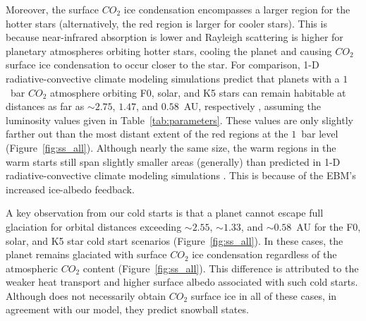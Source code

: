 \documentclass[fleqn,usenatbib]{mnras}
\begin{document}
Moreover, the surface $CO_{\mathrm{2}}$ ice condensation encompasses a larger region for the hotter stars (alternatively, the red region is larger for cooler stars). This is because near-infrared absorption is lower and Rayleigh scattering is higher for planetary atmospheres orbiting hotter stars, cooling the planet and causing $CO_{\mathrm{2}}$ surface ice condensation to occur closer to the star. For comparison, 1-D radiative-convective climate modeling simulations predict that planets with a $1$~bar $CO_{\mathrm{2}}$ atmosphere orbiting F0, solar, and K5 stars can remain habitable at distances as far as $\sim 2.75$, $1.47$, and $0.58$~AU, respectively \citep{kasting1993, KumarKopparapu2013,Ramirez2018}, assuming the luminosity values given in Table~\ref{tab:parameters}. These values are only slightly farther out than the most distant extent of the red regions at the $1$~bar level (Figure~\ref{fig:ss_all}). Although nearly the same size, the warm regions in the warm starts still span slightly smaller areas (generally) than predicted in 1-D radiative-convective climate modeling simulations \citep{kasting1993, KumarKopparapu2013,Ramirez2018}. This is because of the EBM's increased ice-albedo feedback.

A key observation from our cold starts is that a planet cannot escape full glaciation for orbital distances exceeding $\sim 2.55$, $\sim1.33$, and $\sim0.58$~AU for the F0, solar, and K5 star cold start scenarios (Figure~\ref{fig:ss_all}). In these cases, the planet remains glaciated with surface $CO_{\mathrm{2}}$ ice condensation regardless of the atmospheric $CO_{\mathrm{2}}$ content (Figure~\ref{fig:ss_all}). This difference is attributed to the weaker heat transport and higher surface albedo associated with such cold starts. Although \citet{Turbet2017} does not necessarily obtain $CO_{\mathrm{2}}$ surface ice in all of these cases, in agreement with our model, they predict snowball states. 

\end{document}
